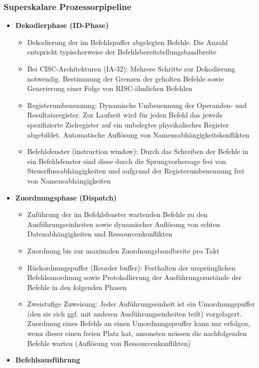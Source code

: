 \subsubsection{Superskalare Prozessorpipeline}
\begin{itemize}
	\item \textbf{Dekodierphase (ID-Phase)}
	\begin{itemize}
		\item Dekodierung der im Befehlspuffer abgelegten Befehle. Die Anzahl entspricht typischerweise der Befehlsbereitstellungsbandbreite
		\item Bei CISC-Architekturen (IA-32): Mehrere Schritte zur Dokodierung notwendig. Bestimmung der Grenzen der geholten Befehle sowie Generierung einer Folge von RISC-ähnlichen Befehlen
		\item Registerumbenennung: Dynamische Umbenennung der Operanden- und Resultatsregister. Zur Laufzeit wird für jeden Befehl das jeweils spezifizierte Zielregister auf ein unbelegtes physikalisches Register abgebildet. Automatische Auflösung von Namensabhängigkeitskonflikten
		\item Befehlsfenster (instruction window): Durch das Schreiben der Befehle in ein Befehlsfenster sind diese durch die Sprungvorhersage frei von Steuerflussabhängigkeiten und aufgrund der Registerumbenennung frei von Namensabhängigkeiten
	\end{itemize}
	\item \textbf{Zuordnungsphase (Dispatch)}
	\begin{itemize}
		\item Zuführung der im Befehlsfenster wartenden Befehle zu den Ausführungseinheiten sowie dynamischer Auflösung von echten Datenabhängigkeiten und Ressourcenkonflikten
		\item Zuordnung bis zur maximalen Zuordnungsbandbreite pro Takt
		\item Rückordnungspuffer (Reorder buffer): Festhalten der ursprünglichen Befehlsanordnung sowie Protokollierung der Ausführungszustände der Befehle in den folgenden Phasen
		\item Zweistufige Zuweisung: Jeder Auführungseinheit ist ein Umordnungspuffer (den sie sich ggf. mit anderen Ausführungseinheiten teilt) vorgelagert. Zuordnung eines Befehls an einen Umordnungspruffer kann nur erfolgen, wenn dieser einen freien Platz hat, ansonsten müssen die nachfolgenden Befehle warten (Auflösung von Ressourcenkonflikten)
	\end{itemize}
	\item \textbf{Befehlsausführung}

\end{itemize}
